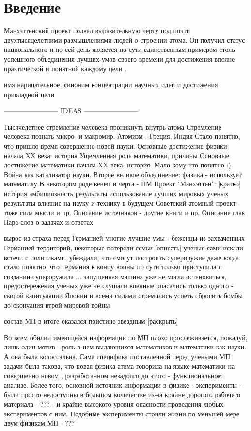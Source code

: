 \chapter*{Введение}

Манхэттенский проект подвел выразительную черту под почти двухтысяцелетними размышлениями людей о строении атома.
Он получил статус национального и по сей день является по сути единственным примером столь успешного объединения лучших умов своего времени для достижения вполне практической и понятной каждому цели \cite{bib_mathphylhist}.

имя нарицательное, синоним концентрации научных идей и достижения прикладной цели



------------------------ IDEAS ------------------------ 

Тысячелетнее стремление человека проникнуть внутрь атома
Стремление человека познать микро- и макромир. Атомизм - Греция, Индия
Стало понятно, что пришло время совершенно новой науки.
Основные достижение физики начала XX века: история
Ущемленная роль математики, причины 
Основные достижение математики начала XX века: история. Мало кому что понятно :)
Война как катализатор науки.
Второе великое объединение: физика - использует математику
В некотором роде венец и черта - ПМ
Проект "Манхэттен": [кратко]
    история
    амбициозность
    результаты
    использование лучших мировых ученых
    результаты
    влияние на науку и технику в будущем
Советский атомный проект - тоже сила мысли и пр.
Описание источников - другие книги и пр.
Описание глав
Пара слов о задачах и ответах



вырос из страха перед Германией
многие лучшие умы - беженцы из захваченных Германией территорий, некоторые потеряли семьи [описать]
ученые сами искали встечи с политиками, убеждали, что смогут построить супероружие
даже когда стало понятно, что Германия к концу войны по сути только приступила с создании супероружила ...  запущенная машина уже не могла остановиться, предостережения ученых уже не слушали
военные опасались только  одного - скорой капитуляции Японии и всеми силами стремились успеть сбросить бомбы до окончания втрой мировой войны

состав МП в итоге оказался поистине звездным [раскрыть]

Во всем обилии имеющейся информации по МП плохо прослеживается, пожалуй, лишь один мотив - роль в нем выдающихся математиков и математики как науки.
А она была колоссальна.
Сама специфика поставленной перед учеными МП задачи была такова, что новая физика атома говорила на языке математики на совершенно новом , разработанном незадолго до этого - функциональном анализе.
Более того, основной источник информации в физике - эксперименты - были просто недоступны в большом количестве из-за крайне дорогого рабочего материала - ??? - 
и крайне высокого уровня опасности проведения любых экспериментов с ним. Подобные эксперименты стоили жизни по меньшей мере двум физикам МП - ???

